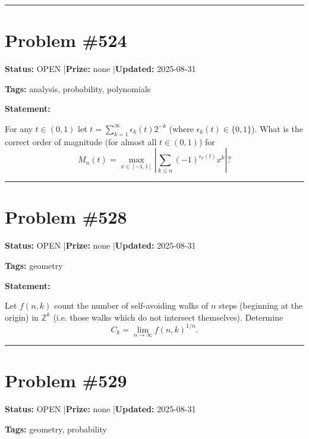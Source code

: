 \documentclass{article}
\begin{document}
\noindent\rule{\linewidth}{0.4pt}


\section{Problem \#524}
\label{prob:524}

\noindent\textbf{Status:} OPEN \quad|\quad \textbf{Prize:} none \quad|\quad \textbf{Updated:} 2025-08-31

\noindent\textbf{Tags:} analysis, probability, polynomials

\medskip

\noindent\textbf{Statement:}

For any $t\in (0,1)$ let $t=\sum_{k=1}^\infty \epsilon_k(t)2^{-k}$ (where $\epsilon_k(t)\in \{0,1\}$). What is the correct order of magnitude (for almost all $t\in(0,1)$) for\[M_n(t)=\max_{x\in [-1,1]}\left\lvert \sum_{k\leq n}(-1)^{\epsilon_k(t)}x^k\right\rvert?\]

\noindent\rule{\linewidth}{0.4pt}


\section{Problem \#528}
\label{prob:528}

\noindent\textbf{Status:} OPEN \quad|\quad \textbf{Prize:} none \quad|\quad \textbf{Updated:} 2025-08-31

\noindent\textbf{Tags:} geometry

\medskip

\noindent\textbf{Statement:}

Let $f(n,k)$ count the number of self-avoiding walks of $n$ steps (beginning at the origin) in $\mathbb{Z}^k$ (i.e. those walks which do not intersect themselves). Determine\[C_k=\lim_{n\to\infty}f(n,k)^{1/n}.\]

\noindent\rule{\linewidth}{0.4pt}


\section{Problem \#529}
\label{prob:529}

\noindent\textbf{Status:} OPEN \quad|\quad \textbf{Prize:} none \quad|\quad \textbf{Updated:} 2025-08-31

\noindent\textbf{Tags:} geometry, probability
\end{document}
